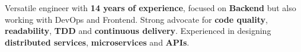 \documentclass[10pt,a4paper,ragged2e,withhyper]{altacv}
\newcommand{\accentbold}[1]{\textbf{\textcolor{accent}{#1}}}
\begin{document}
\begin{paracol}{2}









\switchcolumn

%

%
%
%


Versatile engineer with \accentbold{14 years of experience}, focused on \accentbold{Backend} but also working with DevOps and Frontend. Strong advocate for \accentbold{code quality}, \accentbold{readability}, \accentbold{TDD} and \accentbold{continuous delivery}. Experienced in designing \accentbold{distributed services}, \accentbold{microservices} and \accentbold{APIs}.

\begingroup
\setlength{\parskip}{1em}


\end{paracol}
\end{document}
